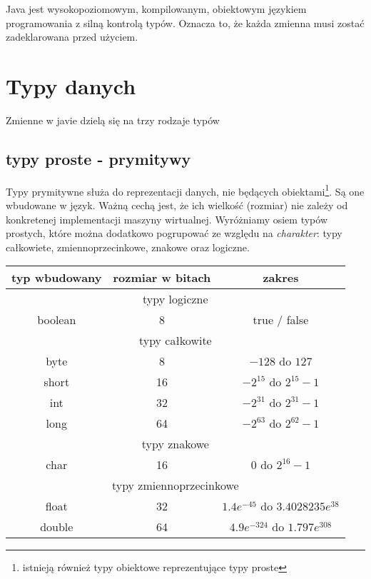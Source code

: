 \documentclass[11pt]{article}
\begin{document}
Java jest wysokopoziomowym, kompilowanym, obiektowym językiem programowania z silną kontrolą typów. Oznacza to, że każda zmienna musi zostać zadeklarowana przed użyciem. 

\section{Typy danych}
Zmienne w javie dzielą się na trzy rodzaje typów
\subsection{typy proste - prymitywy}
Typy prymitywne służa do reprezentacji danych, nie będących obiektami\footnote{istnieją również typy obiektowe reprezentujące typy proste}. Są one wbudowane w język. Ważną cechą jest, że ich wielkość (rozmiar) nie zależy od konkretenej implementacji maszyny wirtualnej. Wyróżniamy osiem typów prostych, które można dodatkowo pogrupować ze względu na \textit{charakter}: typy całkowiete, zmiennoprzecinkowe, znakowe oraz logiczne.

\begin{table}[h]
\centering
\begin{tabular}{|c|c|c|} 
\hline \textbf{typ wbudowany} & \textbf{rozmiar w bitach} & \textbf{zakres} \\
\hline \multicolumn{3}{|c|}{typy logiczne} \\
\hline boolean & 8 & true / false \\
\hline \multicolumn{3}{|c|}{typy całkowite} \\
\hline byte & 8 & $-128$ do $127$ \\ 
\hline short & 16 & $-2^{15}$ do $2^{15}-1$ \\
\hline int & 32 & $-2^{31}$ do $2^{31}-1$ \\
\hline long & 64 & $-2^{63}$ do $2^{62}-1$ \\
\hline \multicolumn{3}{|c|}{typy znakowe} \\
\hline char & 16 & $0$ do $2^{16}-1$ \\
\hline \multicolumn{3}{|c|}{typy zmiennoprzecinkowe} \\
\hline float & 32 & $1.4e^{-45}$ do $3.4028235e^{38}$ \\
\hline double & 64 & $4.9e^{-324}$ do $1.797e^{308} $ \\

\hline
\end{tabular}
\end{table}
\end{document}
